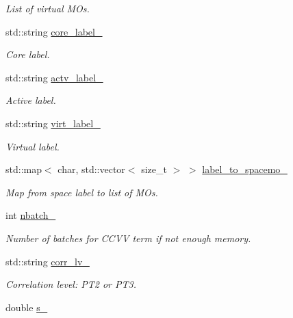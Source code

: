 \begin{DoxyCompactItemize}
\begin{DoxyCompactList}\small\item\em List of virtual M\+Os. \end{DoxyCompactList}\item 
std\+::string \mbox{\hyperlink{classforte_1_1_d_s_r_g___m_r_p_t_ab08ccc8d4bed9a111d316aef3d61a980}{core\+\_\+label\+\_\+}}
\begin{DoxyCompactList}\small\item\em Core label. \end{DoxyCompactList}\item 
std\+::string \mbox{\hyperlink{classforte_1_1_d_s_r_g___m_r_p_t_a30db0191325369681babb5ce7a2bb456}{actv\+\_\+label\+\_\+}}
\begin{DoxyCompactList}\small\item\em Active label. \end{DoxyCompactList}\item 
std\+::string \mbox{\hyperlink{classforte_1_1_d_s_r_g___m_r_p_t_aa2254fd7d2ee05ad19b5b15e9718cb49}{virt\+\_\+label\+\_\+}}
\begin{DoxyCompactList}\small\item\em Virtual label. \end{DoxyCompactList}\item 
std\+::map$<$ char, std\+::vector$<$ size\+\_\+t $>$ $>$ \mbox{\hyperlink{classforte_1_1_d_s_r_g___m_r_p_t_adc911c4abf0f421f8bab1571d570d5ab}{label\+\_\+to\+\_\+spacemo\+\_\+}}
\begin{DoxyCompactList}\small\item\em Map from space label to list of M\+Os. \end{DoxyCompactList}\item 
int \mbox{\hyperlink{classforte_1_1_d_s_r_g___m_r_p_t_aabab74a6c74bbc8219215ed01587788f}{nbatch\+\_\+}}
\begin{DoxyCompactList}\small\item\em Number of batches for C\+C\+VV term if not enough memory. \end{DoxyCompactList}\item 
std\+::string \mbox{\hyperlink{classforte_1_1_d_s_r_g___m_r_p_t_ab92bfdb1697818439f8b551a3e546b00}{corr\+\_\+lv\+\_\+}}
\begin{DoxyCompactList}\small\item\em Correlation level\+: P\+T2 or P\+T3. \end{DoxyCompactList}\item 
double \mbox{\hyperlink{classforte_1_1_d_s_r_g___m_r_p_t_af332d95c9728aefd908a0bfa4b8c86aa}{s\+\_\+}}

\end{DoxyCompactItemize}
